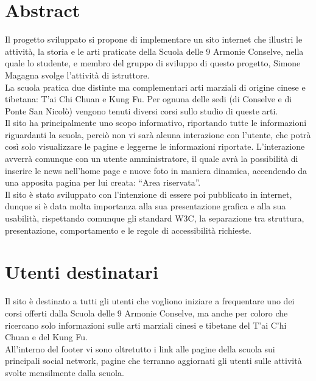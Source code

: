 \section{Abstract}

Il progetto sviluppato si propone di implementare un sito internet che illustri le attività, la storia e le arti praticate della Scuola delle 9 Armonie Conselve, nella quale lo studente, e membro del gruppo di sviluppo di questo progetto, Simone Magagna svolge l'attività di istruttore. \\
La scuola pratica due distinte ma complementari arti marziali di origine cinese e tibetana: T'ai Chi Chuan e Kung Fu. Per ognuna delle sedi (di Conselve e di Ponte San Nicolò) vengono tenuti diversi corsi sullo studio di queste arti.\\
Il sito ha principalmente uno scopo informativo, riportando tutte le informazioni riguardanti la scuola, perciò non vi sarà alcuna interazione con l'utente, che potrà così solo visualizzare le pagine e leggerne le informazioni riportate. L'interazione avverrà comunque con un utente amministratore, il quale avrà la possibilità di inserire le news nell'home page e nuove foto in maniera dinamica, accendendo da una apposita pagina per lui creata: “Area riservata”.\\
Il sito è stato sviluppato con l'intenzione di essere poi pubblicato in internet, dunque si è data molta importanza alla sua presentazione grafica e alla sua usabilità, rispettando comunque gli standard W3C, la separazione tra struttura, presentazione, comportamento e le regole di accessibilità richieste.

\section{Utenti destinatari}

Il sito è destinato a tutti gli utenti che vogliono iniziare a frequentare uno dei corsi offerti dalla Scuola delle 9 Armonie Conselve, ma anche per coloro che ricercano solo informazioni sulle arti marziali cinesi e tibetane del T'ai C'hi Chuan e del Kung Fu.\\
All'interno del footer vi sono oltretutto i link alle pagine della scuola sui principali social network, pagine che terranno aggiornati gli utenti sulle attività svolte mensilmente dalla scuola.
